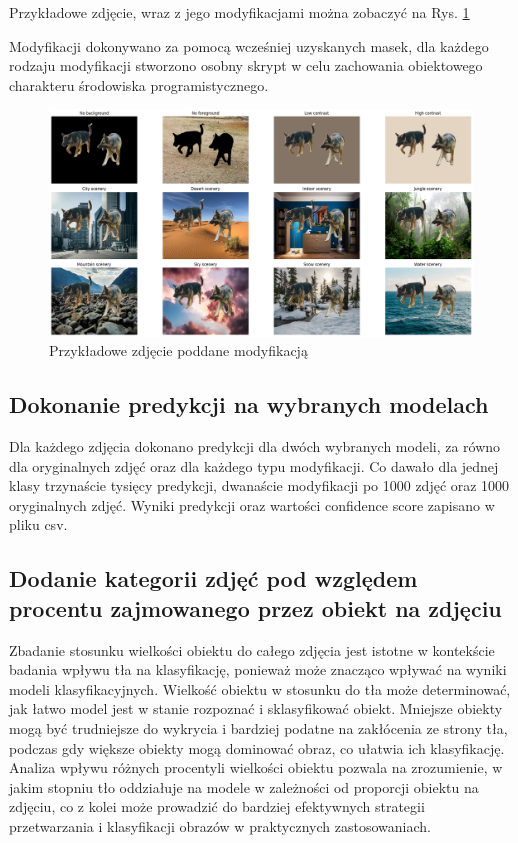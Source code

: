 Przykładowe zdjęcie, wraz z jego modyfikacjami można zobaczyć na Rys. \ref*{rys:modified}

Modyfikacji dokonywano za pomocą wcześniej uzyskanych masek, dla każdego rodzaju modyfikacji stworzono osobny skrypt w celu zachowania obiektowego charakteru środowiska programistycznego.

\begin{figure}
	\centering\includegraphics[width=.9\textwidth]{img/modified}
	\caption{Przykładowe zdjęcie poddane modyfikacją}  \label{rys:modified}
\end{figure}

\subsection*{Dokonanie predykcji na wybranych modelach}

Dla każdego zdjęcia dokonano predykcji dla dwóch wybranych modeli, za równo dla oryginalnych zdjęć oraz dla każdego typu modyfikacji. Co dawało dla jednej klasy trzynaście tysięcy predykcji, dwanaście modyfikacji po 1000 zdjęć oraz 
1000 oryginalnych zdjęć. Wyniki predykcji oraz wartości confidence score zapisano w pliku csv.

\subsection*{Dodanie kategorii zdjęć pod względem procentu zajmowanego przez obiekt na zdjęciu}

Zbadanie stosunku wielkości obiektu do całego zdjęcia jest istotne w kontekście badania wpływu tła na klasyfikację, ponieważ może znacząco wpływać na wyniki modeli klasyfikacyjnych. Wielkość obiektu w stosunku do tła może determinować, 
jak łatwo model jest w stanie rozpoznać i sklasyfikować obiekt. Mniejsze obiekty mogą być trudniejsze do wykrycia i bardziej podatne na zakłócenia ze strony tła, podczas gdy większe obiekty mogą dominować obraz, co ułatwia ich klasyfikację. 
Analiza wpływu różnych procentyli wielkości obiektu pozwala na zrozumienie, w jakim stopniu tło oddziałuje na modele w zależności od proporcji obiektu na zdjęciu, co z kolei może prowadzić do bardziej efektywnych strategii przetwarzania i 
klasyfikacji obrazów w praktycznych zastosowaniach.


